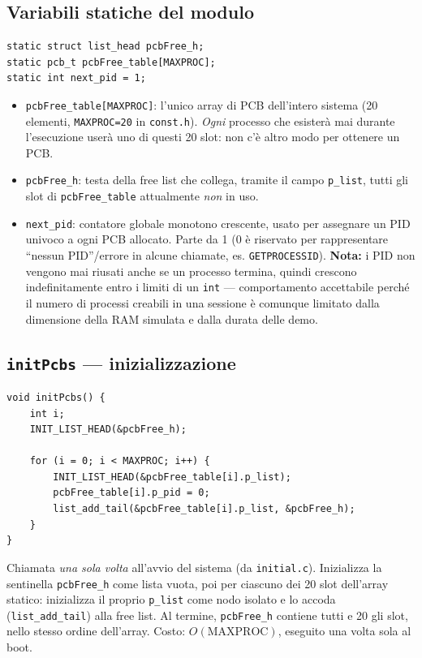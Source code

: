 \documentclass[11pt,a4paper]{article}
\newcommand{\code}[1]{\texttt{#1}}
\newcommand{\func}[1]{\textbf{\texttt{#1}}}
\begin{document}
\subsection{Variabili statiche del modulo}
\begin{lstlisting}
static struct list_head pcbFree_h;
static pcb_t pcbFree_table[MAXPROC];
static int next_pid = 1;
\end{lstlisting}
\begin{itemize}
\item \code{pcbFree\_table[MAXPROC]}: l'unico array di PCB dell'intero
  sistema (20 elementi, \code{MAXPROC=20} in \code{const.h}). \emph{Ogni}
  processo che esisterà mai durante l'esecuzione userà uno di questi 20
  slot: non c'è altro modo per ottenere un PCB.
\item \code{pcbFree\_h}: testa della free list che collega, tramite il
  campo \code{p\_list}, tutti gli slot di \code{pcbFree\_table} attualmente
  \emph{non} in uso.
\item \code{next\_pid}: contatore globale monotono crescente, usato per
  assegnare un PID univoco a ogni PCB allocato. Parte da 1 (0 è riservato
  per rappresentare ``nessun PID''/errore in alcune chiamate, es.
  \code{GETPROCESSID}). \textbf{Nota:} i PID non vengono mai riusati anche se
  un processo termina, quindi crescono indefinitamente entro i limiti di un
  \code{int} --- comportamento accettabile perché il numero di processi
  creabili in una sessione è comunque limitato dalla dimensione della RAM
  simulata e dalla durata delle demo.
\end{itemize}

\subsection{\func{initPcbs} --- inizializzazione}
\begin{lstlisting}
void initPcbs() {
    int i;
    INIT_LIST_HEAD(&pcbFree_h);

    for (i = 0; i < MAXPROC; i++) {
        INIT_LIST_HEAD(&pcbFree_table[i].p_list);
        pcbFree_table[i].p_pid = 0;
        list_add_tail(&pcbFree_table[i].p_list, &pcbFree_h);
    }
}
\end{lstlisting}
Chiamata \emph{una sola volta} all'avvio del sistema (da \code{initial.c}).
Inizializza la sentinella \code{pcbFree\_h} come lista vuota, poi per
ciascuno dei 20 slot dell'array statico: inizializza il proprio
\code{p\_list} come nodo isolato e lo accoda (\code{list\_add\_tail}) alla
free list. Al termine, \code{pcbFree\_h} contiene tutti e 20 gli slot, nello
stesso ordine dell'array. Costo: $O(\text{MAXPROC})$, eseguito una volta
sola al boot.
\end{document}
